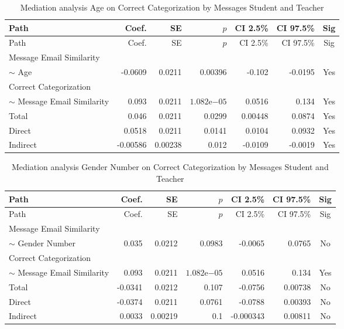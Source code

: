 \begin{longtable}{lrrrrrc}
            \caption{Mediation analysis Age on Correct Categorization by  Messages Student and Teacher}\label{tab:mediation Age on Correct Categorization by  Messages Student and Teacher}\\
            \toprule
            Path & Coef. & SE & $p$ & CI 2.5\% & CI 97.5\% & Sig \\
            \midrule
            \endfirsthead
            \toprule
            Path & Coef. & SE & $p$ & CI 2.5\% & CI 97.5\% & Sig \\
            \midrule
            \endhead
            \bottomrule
            \endfoot
            Message Email Similarity\\ $\sim$ Age & -0.0609 & 0.0211 & 0.00396 & -0.102 & -0.0195 & Yes \\
Correct Categorization\\ $\sim$ Message Email Similarity & 0.093 & 0.0211 & $1.082\mathrm{e}{-05}$ & 0.0516 & 0.134 & Yes \\
Total & 0.046 & 0.0211 & 0.0299 & 0.00448 & 0.0874 & Yes \\
Direct & 0.0518 & 0.0211 & 0.0141 & 0.0104 & 0.0932 & Yes \\
Indirect & -0.00586 & 0.00238 & 0.012 & -0.0109 & -0.0019 & Yes \\
\end{longtable}

\begin{longtable}{lrrrrrc}
            \caption{Mediation analysis Gender Number on Correct Categorization by  Messages Student and Teacher}\label{tab:mediation Gender Number on Correct Categorization by  Messages Student and Teacher}\\
            \toprule
            Path & Coef. & SE & $p$ & CI 2.5\% & CI 97.5\% & Sig \\
            \midrule
            \endfirsthead
            \toprule
            Path & Coef. & SE & $p$ & CI 2.5\% & CI 97.5\% & Sig \\
            \midrule
            \endhead
            \bottomrule
            \endfoot
            Message Email Similarity\\ $\sim$ Gender Number & 0.035 & 0.0212 & 0.0983 & -0.0065 & 0.0765 & No \\
Correct Categorization\\ $\sim$ Message Email Similarity & 0.093 & 0.0211 & $1.082\mathrm{e}{-05}$ & 0.0516 & 0.134 & Yes \\
Total & -0.0341 & 0.0212 & 0.107 & -0.0756 & 0.00738 & No \\
Direct & -0.0374 & 0.0211 & 0.0761 & -0.0788 & 0.00393 & No \\
Indirect & 0.0033 & 0.00219 & 0.1 & -0.000343 & 0.00811 & No \\
\end{longtable}

